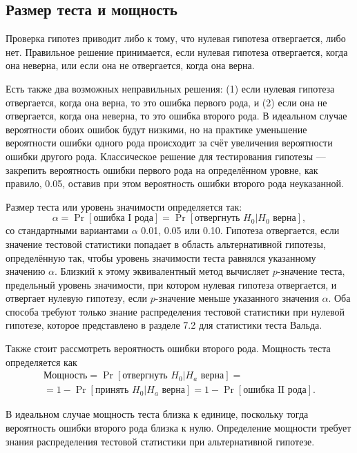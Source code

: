 \subsection{Размер теста и мощность}

Проверка гипотез приводит либо к тому, что нулевая гипотеза отвергается, либо нет. Правильное решение принимается, если нулевая гипотеза отвергается, когда она неверна, или если она не отвергается, когда она верна. 

Есть также два возможных неправильных решения: (1) если нулевая гипотеза отвергается, когда она верна, то это ошибка первого рода, и (2) если она не отвергается, когда она неверна, то это ошибка второго рода. В идеальном случае вероятности обоих ошибок будут низкими, но на практике уменьшение вероятности ошибки одного рода происходит за счёт увеличения вероятности ошибки другого рода. Классическое решение для тестирования гипотезы --- закрепить вероятность ошибки первого рода на определённом уровне, как правило, 0.05, оставив при этом вероятность ошибки второго рода неуказанной.

Размер теста или уровень значимости определяется так:
\begin{equation}
\alpha = \Pr[\text{ошибка I рода}] = \Pr[ \text{отвергнуть } H_0 | H_0 \text{ верна} ],
\end{equation}
со стандартными вариантами $\alpha$ 0.01, 0.05 или 0.10. Гипотеза отвергается, если значение тестовой статистики попадает в область альтернативной гипотезы, определённую так, чтобы уровень значимости теста равнялся указанному значению $\alpha$. Близкий к этому эквивалентный метод вычисляет $p$-значение теста, предельный уровень значимости, при котором нулевая гипотеза отвергается, и отвергает нулевую гипотезу, если $p$-значение меньше указанного значения $\alpha$. Оба способа требуют только знание распределения тестовой статистики при нулевой гипотезе, которое представлено в разделе 7.2 для статистики теста Вальда.

Также стоит рассмотреть вероятность ошибки второго рода. Мощность теста определяется как
\begin{multline}
\text{Мощность} = \Pr[\text{отвергнуть } H_0|H_a \text{ верна}] = \\
= 1 - \Pr[\text{принять } H_0|H_a \text{ верна}] = 1 - \Pr[\text{ошибка II рода}].
\end{multline}

В идеальном случае мощность теста близка к единице, поскольку тогда вероятность ошибки второго рода близка к нулю. Определение мощности требует знания распределения тестовой статистики при альтернативной гипотезе.

